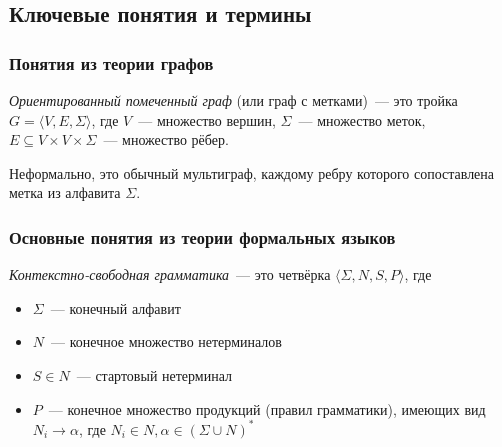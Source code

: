 \subsection{Ключевые понятия и термины}

\subsubsection{Понятия из теории графов}

\begin{definition}
    \textit{Ориентированный помеченный граф} (или граф с метками)~--- это тройка $G = \langle V, E, \Sigma \rangle$, где $V$~--- множество вершин, $\Sigma$~--- множество меток, $E \subseteq V \times V \times \Sigma$~--- множество рёбер. 

    Неформально, это обычный мультиграф, каждому ребру которого сопоставлена метка из алфавита $\Sigma$.
\end{definition}

\begin{definition}

\TODO

\end{definition}

\begin{definition}

\TODO

\end{definition}

\subsubsection{Основные понятия из теории формальных языков}

\begin{definition}
\textit{Контекстно-свободная грамматика}~--- это четвёрка $\langle \Sigma, N, S, P \rangle$, где
\begin{itemize}
    \item $\Sigma$~--- конечный алфавит
    \item $N$~--- конечное множество нетерминалов
    \item $S \in N$~--- стартовый нетерминал
    \item $P$~--- конечное множество продукций (правил грамматики), имеющих вид\\ $N_i \to \alpha$, где $N_i \in N, \alpha \in (\Sigma \cup N)^{*}$
\end{itemize}
\end{definition}

